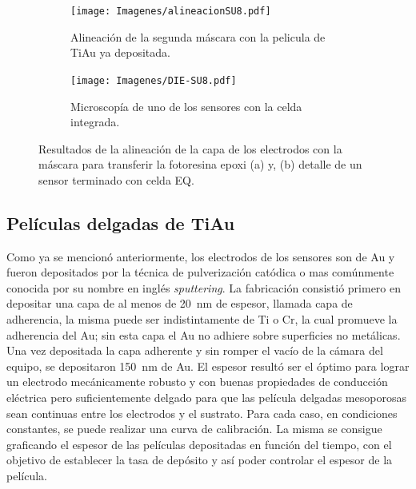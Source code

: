  				\begin{figure}[th]
			 	   	    \centering
			 	   	    \begin{subfigure}[t]{0.495\textwidth}
			        	\texttt{[image: Imagenes/alineacionSU8.pdf]}
			       		\caption{Alineación de la segunda máscara con la pelicula de Ti\textbar Au ya depositada.}
			         	\label{fig:alineacion}
			     		\end{subfigure}
			     		\begin{subfigure}[t]{0.495\textwidth}
			     		\texttt{[image: Imagenes/DIE-SU8.pdf]}
			    		\caption{Microscopía de uno de los sensores con la celda integrada.}
			     		\label{fig:die-su8}	
						\end{subfigure}
						\caption[Alineación y celda integrada en SU8]{Resultados de la alineación de la capa de los electrodos con la máscara para transferir la fotoresina epoxi (a) y, (b) detalle de un sensor terminado con celda EQ.}
			     		\label{fig:resultados-su8}
			     	   	\end{figure}

 		\subsection{Películas delgadas de Ti\textbar Au}

		 Como ya se mencionó anteriormente, los electrodos de los sensores son de Au y fueron depositados por la técnica de pulverización catódica o mas comúnmente conocida por su nombre en inglés \textit{sputtering}. La fabricación consistió primero en depositar una capa de al menos de \SI{20}{\nm} de espesor, llamada capa de  adherencia, la misma puede ser indistintamente de Ti o Cr, la cual promueve la adherencia del Au; sin esta capa el Au no adhiere sobre superficies no metálicas.\cite{Hieber1976} Una vez depositada la capa adherente y sin romper el vacío de la cámara del equipo, se depositaron \SI{150}{nm} de Au. El espesor resultó ser el óptimo para lograr un electrodo mecánicamente robusto y con buenas propiedades de conducción eléctrica pero suficientemente delgado para que las película delgadas mesoporosas sean continuas entre los electrodos y el sustrato. Para cada caso, en condiciones constantes, se puede realizar una curva de calibración. La misma se consigue graficando el espesor de las películas depositadas en función del tiempo, con el objetivo de establecer la tasa de depósito y así poder controlar el espesor de la película. 

